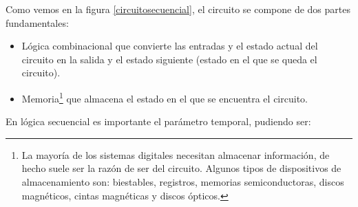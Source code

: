 \documentclass[a4paper, 11pt, titlepage]{article}
\begin{document}
	Como vemos en la figura \ref{circuitosecuencial}, el circuito se compone de dos partes fundamentales:

	\begin{itemize}
		\item Lógica combinacional que convierte las entradas y el estado actual del circuito en la salida
		y el estado siguiente (estado en el que se queda el circuito).
		\item Memoria\footnote{
			La mayoría de los sistemas digitales necesitan almacenar información, de hecho suele ser la 
			razón de ser del circuito. Algunos tipos de dispositivos de almacenamiento son: biestables, 
			registros, memorias semiconductoras, discos magnéticos, cintas magnéticas y discos ópticos.
		} que almacena el estado en el que se encuentra el circuito.
	\end{itemize}

	En lógica secuencial es importante el parámetro temporal, pudiendo ser:
\end{document}
